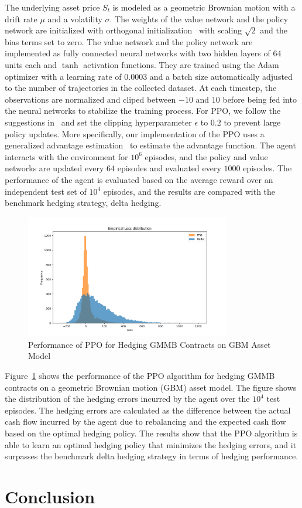 The underlying asset price $S_t$ is modeled as a geometric Brownian motion with a drift rate $\mu$ and a volatility $\sigma$.
The weights of the value network and the policy network are initialized with orthogonal initialization~\citep{engstrom2020implementation} with scaling $\sqrt{2}$ and the bias terms set to zero.
The value network and the policy network are implemented as fully connected neural networks with two hidden layers of 64 units each and $\tanh$ activation functions.
They are trained using the Adam optimizer with a learning rate of $0.0003$ and a batch size automatically adjusted to the number of trajectories in the collected dataset.
At each timestep, the observations are normalized and cliped between $-10$ and $10$ before being fed into the neural networks to stabilize the training process.
For PPO, we follow the suggestions in~\cite{schulman2017proximal} and set the clipping hyperparameter $\epsilon$ to $0.2$ to prevent large policy updates. 
More specifically, our implementation of the PPO uses a generalized advantage estimation~\citep{schulman2015high} to estimate the advantage function.
The agent interacts with the environment for $10^6$ episodes, and the policy and value networks are updated every $64$ episodes and evaluated every $1000$ episodes.
The performance of the agent is evaluated based on the average reward over an independent test set of $10^4$ episodes, and the results are compared with the benchmark hedging strategy, delta hedging.

\begin{figure}
    \centering
    \includegraphics[width=0.8\textwidth]{./project3/figures/loss_distribution.png}
    \caption{Performance of PPO for Hedging GMMB Contracts on GBM Asset Model} 
    \label{fig3:ppo_hedging}
\end{figure}

Figure~\ref{fig3:ppo_hedging} shows the performance of the PPO algorithm for hedging GMMB contracts on a geometric Brownian motion (GBM) asset model.
The figure shows the distribution of the hedging errors incurred by the agent over the $10^4$ test episodes.
The hedging errors are calculated as the difference between the actual cash flow incurred by the agent due to rebalancing and the expected cash flow based on the optimal hedging policy.
The results show that the PPO algorithm is able to learn an optimal hedging policy that minimizes the hedging errors, and it surpasses the benchmark delta hedging strategy in terms of hedging performance.

\section{Conclusion}


